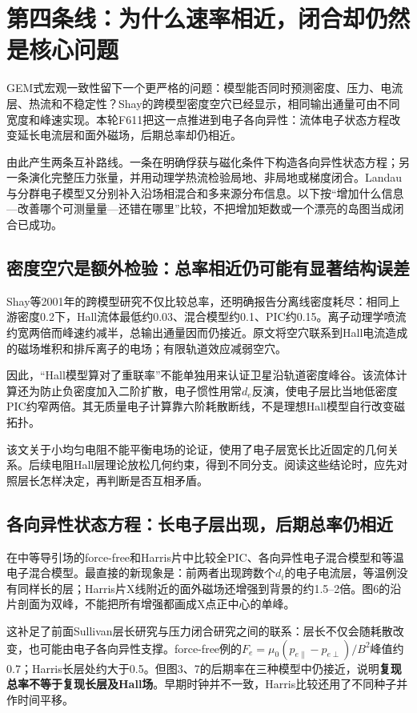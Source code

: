 \section{第四条线：为什么速率相近，闭合却仍然是核心问题}\label{story:closure}
GEM式宏观一致性留下一个更严格的问题：模型能否同时预测密度、压力、电流层、热流和不稳定性？Shay的跨模型密度空穴已经显示，相同输出通量可由不同宽度和峰速实现。本轮F611把这一点推进到电子各向异性：流体电子状态方程改变延长电流层和面外磁场，后期总率却仍相近。

由此产生两条互补路线。一条在明确俘获与磁化条件下构造各向异性状态方程；另一条演化完整压力张量，并用动理学热流检验局地、非局地或梯度闭合。Landau与分群电子模型又分别补入沿场相混合和多来源分布信息。以下按“增加什么信息—改善哪个可测量量—还错在哪里”比较，不把增加矩数或一个漂亮的岛图当成闭合已成功。

\subsection{密度空穴是额外检验：总率相近仍可能有显著结构误差}
Shay等2001年的跨模型研究不仅比较总率，还明确报告分离线密度耗尽：相同上游密度0.2下，Hall流体最低约0.03、混合模型约0.1、PIC约0.15。离子动理学喷流约宽两倍而峰速约减半，总输出通量因而仍接近。原文将空穴联系到Hall电流造成的磁场堆积和排斥离子的电场；有限轨道效应减弱空穴。\citep{Shay2001}

因此，“Hall模型算对了重联率”不能单独用来认证卫星沿轨道密度峰谷。该流体计算还为防止负密度加入二阶扩散，电子惯性用常$d_e$反演，使电子层比当地低密度PIC约窄两倍。其无质量电子计算靠六阶耗散断线，不是理想Hall模型自行改变磁拓扑。

该文关于小均匀电阻不能平衡电场的论证，使用了电子层宽长比近固定的几何关系。后续电阻Hall层理论放松几何约束，得到不同分支。阅读这些结论时，应先对照层长怎样决定，再判断是否互相矛盾。\citep{Shay2001,Malyshkin2008,Simakov2009}

\subsection{各向异性状态方程：长电子层出现，后期总率仍相近}\label{sec:synthesis-anisotropy}
\citet{F611}在中等导引场的force-free和Harris片中比较全PIC、各向异性电子混合模型和等温电子混合模型。最直接的新现象是：前两者出现跨数个$d_i$的电子电流层，等温例没有同样长的层；Harris片X线附近的面外磁场还增强到背景的约1.5--2倍。图6的沿片剖面为双峰，不能把所有增强都画成X点正中心的单峰。

这补足了前面Sullivan层长研究与压力闭合研究之间的联系：层长不仅会随耗散改变，也可能由电子各向异性支撑。force-free例的$F_e=\mu_0(p_{e\parallel}-p_{e\perp})/B^2$峰值约0.7；Harris长层处约大于0.5。但图3、7的后期率在三种模型中仍接近，说明\textbf{复现总率不等于复现长层及Hall场}。早期时钟并不一致，Harris比较还用了不同种子并作时间平移。

